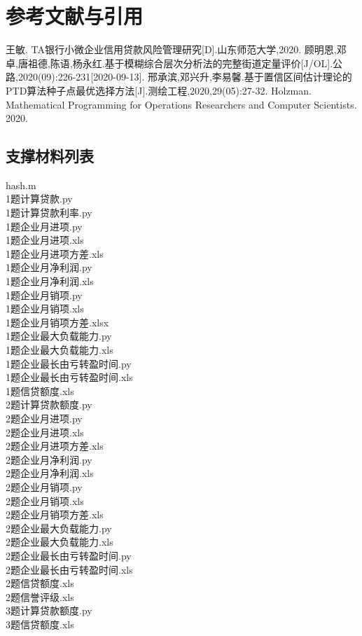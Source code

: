 \documentclass[dvipsnames,withoutpreface,bwprint]{cumcmthesis}
\begin{document}
\section{参考文献与引用}
\vspace{-1cm}
\begin{thebibliography}{1}
     王敏. TA银行小微企业信用贷款风险管理研究[D].山东师范大学,2020.
     顾明恩,邓卓,唐祖德,陈语,杨永红.基于模糊综合层次分析法的完整街道定量评价[J/OL].公路,2020(09):226-231[2020-09-13].
     邢承滨,邓兴升,李易馨.基于置信区间估计理论的PTD算法种子点最优选择方法[J].测绘工程,2020,29(05):27-32.
     Holzman. Mathematical Programming for Operations Researchers and Computer Scientists. 2020.
\end{thebibliography} 
\newpage
\begin{appendices}
\section{支撑材料列表}
\noindent hash.m\\
1题计算贷款.py\\
1题计算贷款利率.py\\
1题企业月进项.py\\
1题企业月进项.xls\\
1题企业月进项方差.xls\\
1题企业月净利润.py\\
1题企业月净利润.xls\\
1题企业月销项.py\\
1题企业月销项.xls\\
1题企业月销项方差.xlsx\\
1题企业最大负载能力.py\\
1题企业最大负载能力.xls\\
1题企业最长由亏转盈时间.py\\
1题企业最长由亏转盈时间.xls\\
1题信贷额度.xls\\
2题计算贷款额度.py\\
2题企业月进项.py\\
2题企业月进项.xls\\
2题企业月进项方差.xls\\
2题企业月净利润.py\\
2题企业月净利润.xls\\
2题企业月销项.py\\
2题企业月销项.xls\\
2题企业月销项方差.xls\\
2题企业最大负载能力.py\\
2题企业最大负载能力.xls\\
2题企业最长由亏转盈时间.py\\
2题企业最长由亏转盈时间.xls\\
2题信贷额度.xls\\
2题信誉评级.xls\\
3题计算贷款额度.py\\
3题信贷额度.xls\\

\end{appendices}
\end{document}
